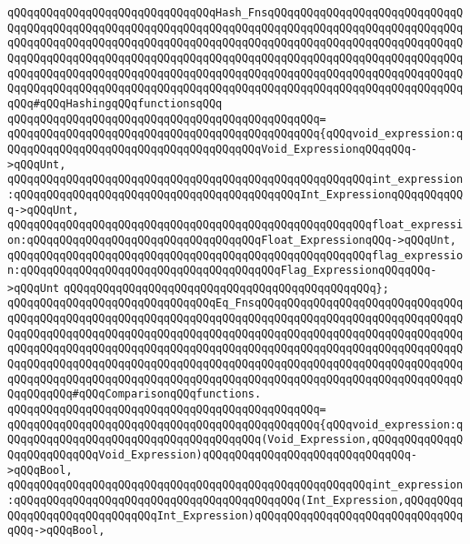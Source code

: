 \verb|qQQqqQQqqQQqqQQqqQQqqQQqqQQqqQQqHash_FnsqQQqqQQqqQQqqQQqqQQqqQQqqQQqqQQqqQQqqQQqqQQqqQQqqQQqqQQqqQQqqQQqqQQqqQQqqQQqqQQqqQQqqQQqqQQqqQQqqQQqqQQqqQQqqQQqqQQqqQQqqQQqqQQqqQQqqQQqqQQqqQQqqQQqqQQqqQQqqQQqqQQqqQQqqQQqqQQqqQQqqQQqqQQqqQQqqQQqqQQqqQQqqQQqqQQqqQQqqQQqqQQqqQQqqQQqqQQqqQQqqQQqqQQqqQQqqQQqqQQqqQQqqQQqqQQqqQQqqQQqqQQqqQQqqQQqqQQqqQQqqQQqqQQqqQQqqQQqqQQqqQQqqQQqqQQqqQQqqQQqqQQqqQQqqQQqqQQqqQQqqQQqqQQqqQQqqQQqqQQqqQQq#qQQqHashingqQQqfunctionsqQQq|\newline
\verb|qQQqqQQqqQQqqQQqqQQqqQQqqQQqqQQqqQQqqQQqqQQqqQQq=|\newline
\verb|qQQqqQQqqQQqqQQqqQQqqQQqqQQqqQQqqQQqqQQqqQQqqQQq{qQQqvoid_expression:qQQqqQQqqQQqqQQqqQQqqQQqqQQqqQQqqQQqqQQqVoid_ExpressionqQQqqQQq->qQQqUnt,|\newline
\verb|qQQqqQQqqQQqqQQqqQQqqQQqqQQqqQQqqQQqqQQqqQQqqQQqqQQqqQQqint_expression:qQQqqQQqqQQqqQQqqQQqqQQqqQQqqQQqqQQqqQQqqQQqInt_ExpressionqQQqqQQqqQQq->qQQqUnt,|\newline
\verb|qQQqqQQqqQQqqQQqqQQqqQQqqQQqqQQqqQQqqQQqqQQqqQQqqQQqqQQqfloat_expression:qQQqqQQqqQQqqQQqqQQqqQQqqQQqqQQqqQQqFloat_ExpressionqQQq->qQQqUnt,|\newline
\verb|qQQqqQQqqQQqqQQqqQQqqQQqqQQqqQQqqQQqqQQqqQQqqQQqqQQqqQQqflag_expression:qQQqqQQqqQQqqQQqqQQqqQQqqQQqqQQqqQQqqQQqFlag_ExpressionqQQqqQQq->qQQqUnt|\newline
\verb|qQQqqQQqqQQqqQQqqQQqqQQqqQQqqQQqqQQqqQQqqQQqqQQq};|\newline
\newline
\verb|qQQqqQQqqQQqqQQqqQQqqQQqqQQqqQQqEq_FnsqQQqqQQqqQQqqQQqqQQqqQQqqQQqqQQqqQQqqQQqqQQqqQQqqQQqqQQqqQQqqQQqqQQqqQQqqQQqqQQqqQQqqQQqqQQqqQQqqQQqqQQqqQQqqQQqqQQqqQQqqQQqqQQqqQQqqQQqqQQqqQQqqQQqqQQqqQQqqQQqqQQqqQQqqQQqqQQqqQQqqQQqqQQqqQQqqQQqqQQqqQQqqQQqqQQqqQQqqQQqqQQqqQQqqQQqqQQqqQQqqQQqqQQqqQQqqQQqqQQqqQQqqQQqqQQqqQQqqQQqqQQqqQQqqQQqqQQqqQQqqQQqqQQqqQQqqQQqqQQqqQQqqQQqqQQqqQQqqQQqqQQqqQQqqQQqqQQqqQQqqQQqqQQqqQQqqQQqqQQqqQQqqQQqqQQq#qQQqComparisonqQQqfunctions.|\newline
\verb|qQQqqQQqqQQqqQQqqQQqqQQqqQQqqQQqqQQqqQQqqQQqqQQq=|\newline
\verb|qQQqqQQqqQQqqQQqqQQqqQQqqQQqqQQqqQQqqQQqqQQqqQQq{qQQqvoid_expression:qQQqqQQqqQQqqQQqqQQqqQQqqQQqqQQqqQQqqQQq(Void_Expression,qQQqqQQqqQQqqQQqqQQqqQQqqQQqVoid_Expression)qQQqqQQqqQQqqQQqqQQqqQQqqQQqqQQq->qQQqBool,|\newline
\verb|qQQqqQQqqQQqqQQqqQQqqQQqqQQqqQQqqQQqqQQqqQQqqQQqqQQqqQQqint_expression:qQQqqQQqqQQqqQQqqQQqqQQqqQQqqQQqqQQqqQQqqQQq(Int_Expression,qQQqqQQqqQQqqQQqqQQqqQQqqQQqqQQqInt_Expression)qQQqqQQqqQQqqQQqqQQqqQQqqQQqqQQqqQQq->qQQqBool,|\newline

